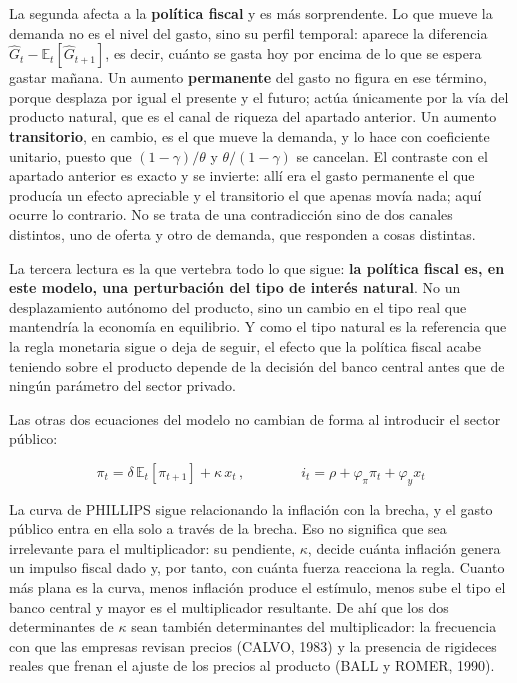 \documentclass[10pt,a4paper]{article}
\begin{document}
La segunda afecta a la \textbf{política fiscal} y es más sorprendente. Lo que mueve la demanda no es el nivel del gasto, sino su perfil temporal: aparece la diferencia $\hat{G}_{t}-\mathbb{E}_{t}[\hat{G}_{t+1}]$, es decir, cuánto se gasta hoy por encima de lo que se espera gastar mañana. Un aumento \textbf{permanente} del gasto no figura en ese término, porque desplaza por igual el presente y el futuro; actúa únicamente por la vía del producto natural, que es el canal de riqueza del apartado anterior. Un aumento \textbf{transitorio}, en cambio, es el que mueve la demanda, y lo hace con coeficiente unitario, puesto que $\left(1-\gamma\right)/\theta$ y $\theta/\left(1-\gamma\right)$ se cancelan. El contraste con el apartado anterior es exacto y se invierte: allí era el gasto permanente el que producía un efecto apreciable y el transitorio el que apenas movía nada; aquí ocurre lo contrario. No se trata de una contradicción sino de dos canales distintos, uno de oferta y otro de demanda, que responden a cosas distintas.

La tercera lectura es la que vertebra todo lo que sigue: \textbf{la política fiscal es, en este modelo, una perturbación del tipo de interés natural}. No un desplazamiento autónomo del producto, sino un cambio en el tipo real que mantendría la economía en equilibrio. Y como el tipo natural es la referencia que la regla monetaria sigue o deja de seguir, el efecto que la política fiscal acabe teniendo sobre el producto depende de la decisión del banco central antes que de ningún parámetro del sector privado.

Las otras dos ecuaciones del modelo no cambian de forma al introducir el sector público:

$$\pi_{t}=\delta\,\mathbb{E}_{t}\left[\pi_{t+1}\right]+\kappa\,x_{t}\,,\qquad\qquad i_{t}=\rho+\varphi_{\pi}\pi_{t}+\varphi_{y}x_{t}$$

La curva de PHILLIPS sigue relacionando la inflación con la brecha, y el gasto público entra en ella solo a través de la brecha. Eso no significa que sea irrelevante para el multiplicador: su pendiente, $\kappa$, decide cuánta inflación genera un impulso fiscal dado y, por tanto, con cuánta fuerza reacciona la regla. Cuanto más plana es la curva, menos inflación produce el estímulo, menos sube el tipo el banco central y mayor es el multiplicador resultante. De ahí que los dos determinantes de $\kappa$ sean también determinantes del multiplicador: la frecuencia con que las empresas revisan precios (CALVO, 1983) y la presencia de rigideces reales que frenan el ajuste de los precios al producto (BALL y ROMER, 1990).
\end{document}

